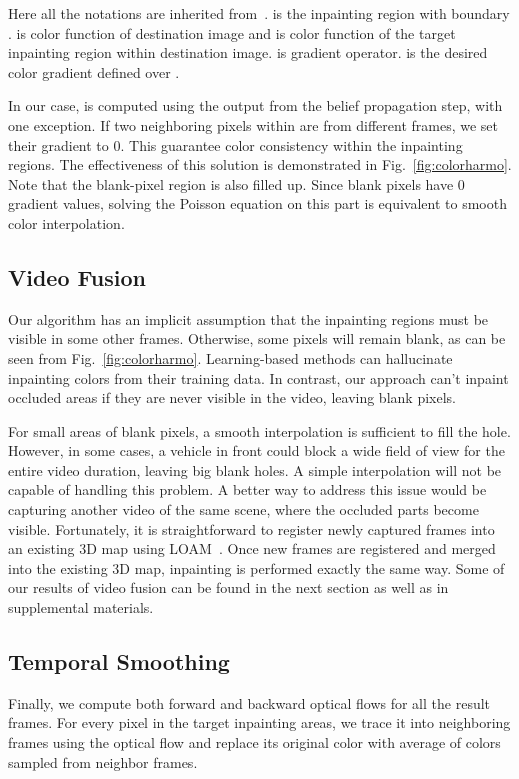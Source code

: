 \documentclass[runningheads]{llncs}
\begin{document}
Here all the notations are inherited from~\cite{Perez:2003:PIE:1201775.882269}.  is the inpainting region with boundary .  is color function of destination image and  is color function of the target inpainting region within destination image.  is gradient operator.  is the desired color gradient defined over .

In our case,  is computed using the output from the belief propagation step, with one exception. If two neighboring pixels within  are from different frames, we set their gradient to 0. This guarantee color consistency within the inpainting regions. The effectiveness of this solution is demonstrated in Fig.~\ref{fig:colorharmo}. Note that the blank-pixel region is also filled up. Since blank pixels have 0 gradient values, solving the Poisson equation on this part is equivalent to smooth color interpolation.

\subsection{Video Fusion} 
Our algorithm has an implicit assumption that the inpainting regions must be visible in some other frames. Otherwise, some pixels will remain blank, as can be seen from Fig.~\ref{fig:colorharmo}. Learning-based methods can hallucinate inpainting colors from their training data. In contrast, our approach can't inpaint occluded areas if they are never visible in the video, leaving blank pixels.   

For small areas of blank pixels, a smooth interpolation is sufficient to fill the hole. However, in some cases, a vehicle in front could block a wide field of view for the entire video duration, leaving big blank holes. A simple interpolation will not be capable of handling this problem. A better way to address this issue would be capturing another video of the same scene, where the occluded parts become visible. Fortunately, it is straightforward to register newly captured frames into an existing 3D map using LOAM~\cite{Zhang-2014-7903}. Once new frames are registered and merged into the existing 3D map, inpainting is performed exactly the same way. Some of our results of video fusion can be found in the next section as well as in supplemental materials.

\subsection{Temporal Smoothing}
Finally, we compute both forward and backward optical flows for all the result frames. For every pixel in the target inpainting areas, we trace it into neighboring frames using the optical flow and replace its original color with average of colors sampled from neighbor frames.  
\end{document}

